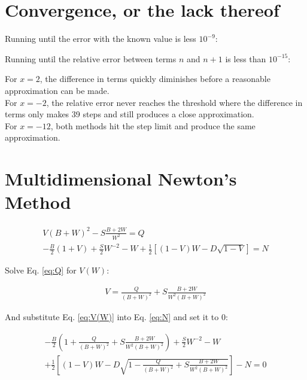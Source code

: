 \documentclass[12pt]{article}
\begin{document}
  \clearpage
  
  \section{Convergence, or the lack thereof}

  

  
  Running until the error with the known value is less $10^{-9}$:
  
  
  Running until the relative error between terms $n$ and $n+1$ is less than $10^{-15}$:
  


  For $x=2$, the difference in terms quickly diminishes before a reasonable
  approximation can be made.
  \\
  For $x=-2$, the relative error never reaches the threshold where the 
  difference in terms only makes 39 steps and still produces a close
  approximation.
  \\
  For $x=-12$, both methods hit the step limit and produce the same approximation.
  

  \clearpage

  \section{Multidimensional Newton's Method}

  \begin{align}
    \label{eq:Q}
    V(B+W)^2 - S\frac{B+2W}{W^2}=Q \\
    \label{eq:N}
    -\frac{B}{2}(1+V)+\frac{S}{2}W^{-2}-W+\frac{1}{2}\left[(1-V)W-D\sqrt{1-V}\right]=N
  \end{align}

  Solve  Eq. \ref{eq:Q} for $V(W)$:

  \begin{align}
    \label{eq:V(W)}
    V = \frac{Q}{(B+W)^2} + S\frac{B+2W}{W^2(B+W)^2}
  \end{align}

  And substitute Eq. \ref{eq:V(W)} into Eq. \ref{eq:N} and set it to 0:
  
  \begin{align}
    -\frac{B}{2}(1+\frac{Q}{(B+W)^2} + S\frac{B+2W}{W^2(B+W)^2})+\frac{S}{2}W^{-2}-W\nonumber\\
+\frac{1}{2}\left[(1-V)W - D\sqrt{1-\frac{Q}{(B+W)^2} + S\frac{B+2W}{W^2(B+W)^2}}\right]-N=0
  \end{align}
\end{document}
